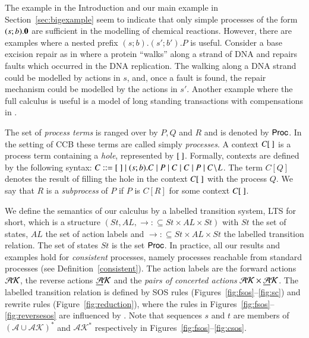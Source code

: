 %
%
The example in the Introduction and our main example in Section~\ref{sec:bigexample} seem to indicate that only
simple processes of the form $(s;b).\mathbf{0}$ are sufficient in the modelling of chemical reactions. 
However, there are examples where a nested prefix $(s;b).(s';b').P$ is useful. 
Consider a base excision repair as in \cite{Köhler2014} where a protein ``walks'' along 
a strand of DNA and repairs faults which occurred in the DNA replication. The walking along a DNA strand 
could be modelled by actions in $s$, and, once a fault is found, the repair mechanism could be modelled
by the actions in $s'$. Another example where the full calculus is useful is a model of long 
standing transactions with compensations in \cite{Irek2012}.


The set of \emph{process terms} is ranged over by $P,Q$ and $R$ and is denoted by $\mathsf{Proc}$. 
In the setting of CCB these terms are called simply \emph{processes}. 
A context $C\mbox{$[\ ]$}$ is a process term containing a \emph{hole}, represented by $\mbox{$[\ ]$}$. 
Formally, contexts are defined by
the following syntax: $C::= \mbox{$[\ ]$} \mid (s;b).C \mid P\; \vert \; C \mid C \; \vert \; P \mid C\!\setminus\!L $.
The term $C[Q]$ denotes the result of filling the hole in the context $C\mbox{$[\ ]$}$ with the process $Q$.
We say that $R$ is a \emph{subprocess} of $P$ if $P$ is $C[R]$ for some context $C\mbox{$[\ ]$}$.

We define the semantics of our calculus by a labelled transition system,
LTS for short, which is a structure $(St,AL,\rightarrow: \subseteq St \times AL \times St)$
with $St$ the set of states, $AL$ the set of action labels and $\rightarrow: 
\subseteq St \times AL \times St$ the labelled transition relation.
The set of states $St$ is the set $\mathsf{Proc}$. In practice, all our results and examples hold for
\emph{consistent} processes, namely processes
reachable from standard processes (see Definition~\ref{consistent}). 
The action labels are the forward actions $\mathcal{AK}$, 
the reverse actions $\underline{\mathcal{A}}\mathcal{K}$ and the \emph{pairs of concerted actions} $\mathcal{AK} \times \underline{\mathcal{A}}\mathcal{K}$. 
%
The labelled transition relation is defined by SOS rules (Figures~\ref{fig:fsos}--\ref{fig:sc}) 
and rewrite rules (Figure~\ref{fig:reduction}), where
the rules in Figures~\ref{fig:fsos}--\ref{fig:reversesos}
are influenced by \cite{Irek2007}. 
Note that
sequences $s$ and $t$ are members of $(\mathcal{A}\cup\mathcal{AK})^*$ and $\mathcal{AK}^*$
respectively in Figures~\ref{fig:fsos}--\ref{fig:csos}.

